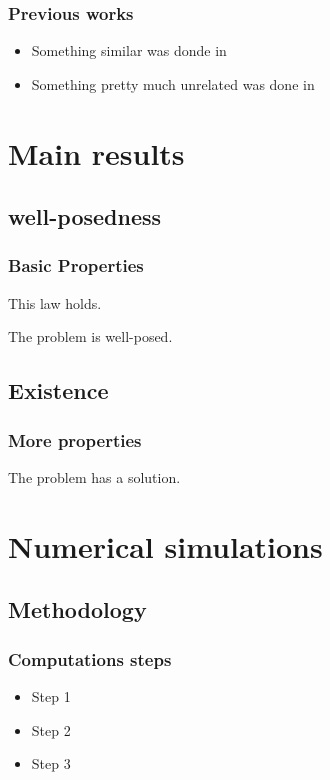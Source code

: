 \documentclass{beamer}
\begin{document}
\begin{frame}
	\frametitle{Previous works}

	\begin{itemize}
		\item Something similar was donde in \cite{DidierAusselDeregulated}
		\item Something pretty much unrelated was done in \cite{morri2024Learning}
	\end{itemize}

\end{frame}

\section{Main results}

\subsection{well-posedness}

\begin{frame}
	\frametitle{Basic Properties}
	\begin{Lemma}
		This law holds.
	\end{Lemma}
	\begin{theorem}
		The problem is well-posed.
	\end{theorem}
\end{frame}

\subsection{Existence}

\begin{frame}
	\frametitle{More properties}
	\begin{theorem}
		The problem has a solution.
	\end{theorem}
\end{frame}

\section{Numerical simulations}

\subsection{Methodology}

\begin{frame}
	\frametitle{Computations steps}
	\begin{itemize}
		\item Step 1
		\item Step 2
		\item Step 3
	\end{itemize}
\end{frame}
\end{document}
